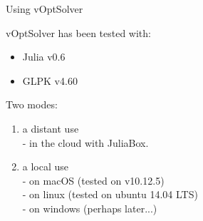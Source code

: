 \documentclass[10pt,xcolor=dvipsnames]{beamer}
\begin{document}
%
% 
\begin{frame}{Using vOptSolver}

vOptSolver has been tested with:
\begin{itemize}
\item Julia v0.6
\item GLPK v4.60
\end{itemize}
\bigskip

Two modes:\\ 
\begin{enumerate}
\item a distant use \\
     \quad - in the cloud with JuliaBox.

\medskip
\item a local use   \\
    \quad - on macOS (tested on v10.12.5) \\
    \quad  - on linux (tested on ubuntu 14.04 LTS)\\
    \quad  - on windows (perhaps later...)
\end{enumerate}

\end{frame}
\end{document}
